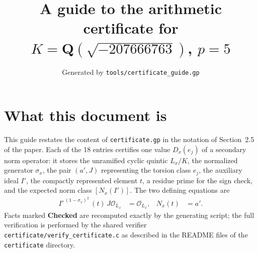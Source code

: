 \documentclass[11pt]{article}
\title{A guide to the arithmetic certificate for $K=\mathbf Q(\sqrt{-207666763})$, $p=5$}
\author{}
\date{Generated by \texttt{tools/certificate\_guide.gp}}
\begin{document}
\maketitle
\section*{What this document is}
This guide restates the content of \texttt{certificate.gp} in the
notation of Section~2.5 of the paper.  Each of the 18 entries
certifies one value $D_x(e_j)$ of a secondary norm operator: it
stores the unramified cyclic quintic $L_x/K$, the normalized
generator $\sigma_x$, the pair $(a',J)$ representing the torsion
class $e_j$, the auxiliary ideal $I'$, the compactly represented
element $t$, a residue prime for the sign check, and the expected
norm class $[N_x(I')]$.  The two defining equations are
\begin{align*}
I'^{\,(1-\sigma_x)^2}\,(t)\,J\mathcal O_{L_x}&=\mathcal O_{L_x},&
N_x(t)&=a'.
\end{align*}
Facts marked \textbf{Checked} are recomputed exactly by the
generating script; the full verification is performed by the
shared verifier \texttt{certificate/verify\_certificate.c} as
described in the README files of the \texttt{certificate}
directory.
\end{document}
